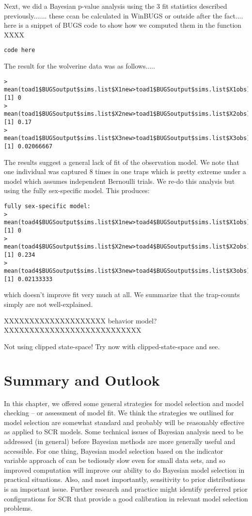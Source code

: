 Next, we did a Bayesian p-value analysis using the 3 fit statistics
described previously.......  these ccan be calculated in WinBUGS or
outside after the fact.... here is a snippet of BUGS code to show how
we computed them in the function XXXX
\begin{verbatim}
code here
\end{verbatim}
The result for the wolverine data was as follows.....
\begin{verbatim}
>  mean(toad1$BUGSoutput$sims.list$X1new>toad1$BUGSoutput$sims.list$X1obs)
[1] 0
>  mean(toad1$BUGSoutput$sims.list$X2new>toad1$BUGSoutput$sims.list$X2obs)
[1] 0.17
>  mean(toad1$BUGSoutput$sims.list$X3new>toad1$BUGSoutput$sims.list$X3obs)
[1] 0.02066667
\end{verbatim}
The results suggest a general lack of fit of the observation model.
We note that one individual  was captured 8 times in one traps which
is pretty extreme under a model which assumes independent Bernoulli
trials. 
We re-do this analysis but using the fully sex-specific model. This produces:
\begin{verbatim}
fully sex-specific model:
>  mean(toad4$BUGSoutput$sims.list$X1new>toad4$BUGSoutput$sims.list$X1obs)
[1] 0
>  mean(toad4$BUGSoutput$sims.list$X2new>toad4$BUGSoutput$sims.list$X2obs)
[1] 0.234
>  mean(toad4$BUGSoutput$sims.list$X3new>toad4$BUGSoutput$sims.list$X3obs)
[1] 0.02133333
\end{verbatim}
which doesn't improve fit very much at all. 
We summarize that the trap-counts simply are not well-explained.

XXXXXXXXXXXXXXXXXXXX behavior model? XXXXXXXXXXXXXXXXXXXXXXXXXXX

 Not using clipped state-space! Try
 now with clipped-state-space and see.

\section{ Summary and Outlook  }



In this chapter, we offered some general strategies for model
selection and model checking -- or assessment of model fit.  We think
the strategies we outlined for model selection are somewhat standard
and probably will be reasonably effective as applied to SCR models.
Some technical issues of Bayesian analysis need to be addressed (in
general) before Bayesian methods are more generally useful and
accessible.  For one thing, Bayesian model selection based on the
indicator variable approach of \citet{kuo_mallick:1998} can be
tediously slow even for small data sets, and so improved computation
will improve our ability to do Bayesian model selection in practical
situations.  Also, and most importantly, sensitivity to prior
distributions is an important issue. Further research and practice
might identify preferred prior configurations for SCR that provide a
good calibration in relevant model selection problems. 



